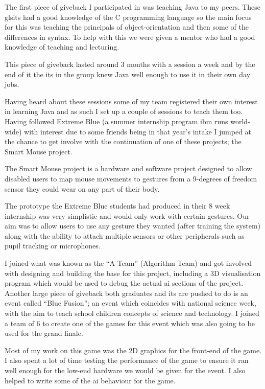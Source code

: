 \documentclass[a4paper,11pt]{report}
\begin{document}
The first piece of giveback I participated in was teaching Java to my peers. These gls{it}s had a
good knowledge of the C programming language so the main focus for this was teaching the principals
of object-orientation and then some of the differences in syntax. To help with this we were given a
mentor who had a good knowledge of teaching and lecturing.

This piece of giveback lasted around 3 months with a session a week and by the end of it the 
\gls{it}s in the group knew Java well enough to use it in their own day jobs.

Having heard about these sessions some of my team registered their own interest in learning Java
and as such I set up a couple of sessions to teach them too. \\



Having followed Extreme Blue (a summer internship program \gls{ibm} runs world-wide) with interest
due to some friends being in that year's intake I jumped at the chance to get involve with the 
continuation of one of these projects; the Smart Mouse project.

The Smart Mouse project is a hardware and software project designed to allow disabled users to map
mouse movements to gestures from a 9-degrees of freedom sensor they could wear on any part of their
body.

The prototype the Extreme Blue students had produced in their 8 week internship was very simplistic
and would only work with certain gestures. Our aim was to allow users to use any gesture they 
wanted (after training the system) along with the ability to attach multiple sensors or other
peripherals such as pupil tracking or microphones.

I joined what was known as the ``A-Team'' (Algorithm Team) and got involved with designing and 
building the base for this project, including a 3D visualisation program which would be used to 
debug the actual \gls{ai} sections of the project. \\



Another large piece of giveback both graduates and \gls{it}s are pushed to do is an event called
``Blue Fusion''; an event which coincides with national science week, with the aim to teach school
children concepts of science and technology. I joined a team of 6 to create one of the games for
this event which was also going to be used for the grand finale.

Most of my work on this game was the 2D graphics for the front-end of the game. I also spent a lot
of time testing the performance of the game to ensure it ran well enough for the low-end hardware
we would be given for the event. I also helped to write some of the \gls{ai} behaviour for the 
game.
\end{document}
